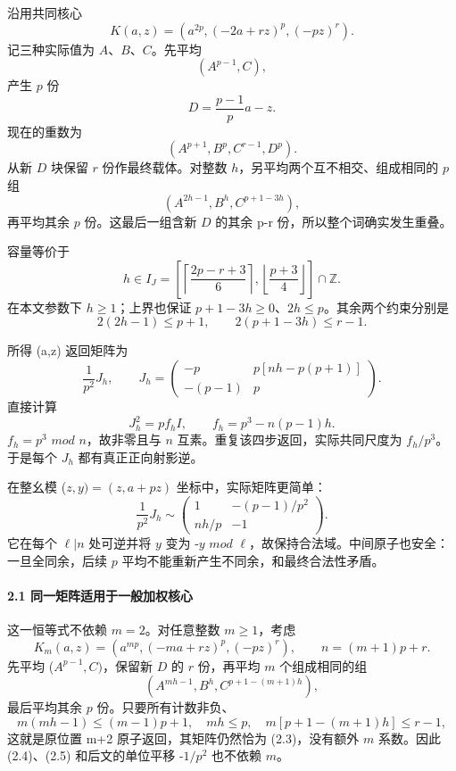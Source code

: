 {沿用共同核心} \[
K(a,z)=(a^{2p},(-2a+rz)^p,(-pz)^r).
\] {记三种实际值为} {\ensuremath{A}、\ensuremath{B}、\ensuremath{C}。先平均} \[
(A^{p-1},C),
\] {产生} {\ensuremath{p}} {份} \[
D=\frac{p-1}{p}a-z.
\] {现在的重数为} \[
(A^{p+1},B^p,C^{r-1},D^p).
\] {从新} {\ensuremath{D}} {块保留} {\ensuremath{r}} {份作最终载体。对整数} {\ensuremath{h}，另平均两个互不相交、组成相同的} {\ensuremath{p}} {组} \[
(A^{2h-1},B^h,C^{p+1-3h}),
\tag{C27.2.1}
\] {再平均其余} {\ensuremath{p}} {份。这最后一组含新} {\ensuremath{D}} {的其余} {p-r} {份，所以整个词确实发生重叠。}

{容量等价于} \[
\boxed{
h\in I_J=
\left[
\left\lceil\frac{2p-r+3}{6}\right\rceil,
\left\lfloor\frac{p+3}{4}\right\rfloor
\right]\cap\mathbb Z.}
\tag{C27.2.2}
\] {在本文参数下} {\ensuremath{h\ge 1}；上界也保证} {\ensuremath{p+1-3h\ge 0}、\ensuremath{2h\le p}。其余两个约束分别是} \[
2(2h-1)\le p+1,\qquad2(p+1-3h)\le r-1.
\]

{所得} {(a,z)} {返回矩阵为} \[
\frac1{p^2}J_h,\qquad
J_h=
\begin{pmatrix}
-p&p[nh-p(p+1)]\\
-(p-1)&p
\end{pmatrix}.
\tag{C27.2.3}
\] {直接计算} \[
\boxed{J_h^2=p f_h I,\qquad
f_h=p^3-n(p-1)h.}
\tag{C27.2.4}
\] {\ensuremath{f_{h}=p^{3}}} {\ensuremath{mod}} {\ensuremath{n}，故非零且与} {\ensuremath{n}} {互素。重复该四步返回，实际共同尺度为} {\ensuremath{f_{h}/p^{3}}。于是每个} {\ensuremath{J_{h}}} {都有真正正向射影逆。}

{在整幺模} {(\ensuremath{z,y)=(z,a+pz)}} {坐标中，实际矩阵更简单：} \[
\frac1{p^2}J_h\sim
\begin{pmatrix}
1&-(p-1)/p^2\\
nh/p&-1
\end{pmatrix}.
\tag{C27.2.5}
\] {它在每个} {\ensuremath{\ell |n}} {处可逆并将} {\ensuremath{y}} {变为} {-\ensuremath{y}} {\ensuremath{mod}} {\ensuremath{\ell }，故保持合法域。中间原子也安全：一旦全同余，后续} {\ensuremath{p}} {平均不能重新产生不同余，和最终合法性矛盾。}

\paragraph*{\texorpdfstring{{2.1} {同一矩阵适用于一般加权核心}}{2.1 同一矩阵适用于一般加权核心}}\label{C27-h169}

{这一恒等式不依赖} {\ensuremath{m=2}。对任意整数} {\ensuremath{m\ge 1}，考虑} \[
K_m(a,z)=(a^{mp},(-ma+rz)^p,(-pz)^r),\qquad n=(m+1)p+r.
\] {先平均} {(\ensuremath{A^{p-1},C)}，保留新} {\ensuremath{D}} {的} {\ensuremath{r}} {份，再平均} {\ensuremath{m}} {个组成相同的组} \[
(A^{mh-1},B^h,C^{p+1-(m+1)h}),
\] {最后平均其余} {\ensuremath{p}} {份。只要所有计数非负、} \[
m(mh-1)\le(m-1)p+1,\quad mh\le p,\quad
m[p+1-(m+1)h]\le r-1,
\tag{C27.2.6}
\] {这就是原位置} {m+2} {原子返回，其矩阵仍然恰为} {(2.3)，没有额外} {\ensuremath{m}} {系数。因此} {(2.4)、(2.5)} {和后文的单位平移} {-\ensuremath{1/p^{2}}} {也不依赖} {\ensuremath{m}。}

